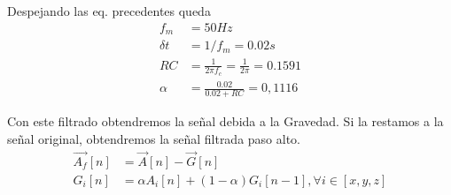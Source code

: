 \documentclass[../tfm.tex]{subfiles}
\begin{document}
Despejando las eq. precedentes queda
\begin{align*}
  f_m & = 50{Hz}\\
  \delta t & = 1/f_m = 0.02s\\
  RC & =\frac{1}{2\pi f_c} = \frac{1}{2\pi} = 0.1591\\
  \alpha & = \frac{0.02}{0.02 + RC} = 0,1116
\end{align*}

Con este filtrado obtendremos la señal debida a la Gravedad. Si la restamos a la señal original, obtendremos la señal filtrada paso alto.
\begin{align*}
  \vec{A_f}[n] & = \vec{A}[n] - \vec{G}[n]  \\
  G_i[n] &= \alpha A_i[n] + (1-\alpha)G_i[n-1], \forall i \in [x,y,z]
\end{align*}







\iffalse
\begin{figure}[!ht]
  \centering
  
\caption{\label{fig:capturaFlow} Flujo de trabajo de la aplicación de captura de datos}
\end{figure}

\fi
\end{document}
